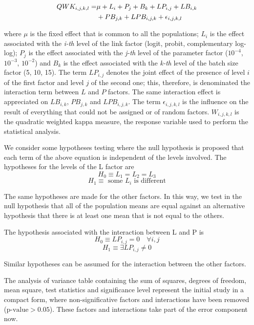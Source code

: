 \documentclass[journal]{IEEEtran}
\begin{document}
	\begin{equation}
	\begin{aligned}
	\footnotesize
	QWK_{i,j,k,l} = & \mu + L_i + P_j + B_k + LP_{i,j} + LB_{i,k} \\& + PB_{j,k} + LPB_{i,j,k} + \epsilon_{i,j,k,l}
	\label{eq:anova3}
	\end{aligned}
	\end{equation}
	
	where $\mu$ is the fixed effect that is common to all the populations; $L_i$ is the effect associated with the \textit{i-th} level of the link factor (logit, probit, complementary log-log); $P_j$ is the effect associated with the \textit{j-th} level of the parameter factor ($10^{-4}$, $10^{-3}$, $10^{-2}$) and $B_k$ is the effect associated with the \textit{k-th} level of the batch size factor (5, 10, 15). The term $LP_{i,j}$ denotes the joint effect of the presence of level $i$ of the first factor and level $j$ of the second one; this, therefore, is denominated the interaction term between $L$ and $P$ factors. The same interaction effect is appreciated on $LB_{i,k}$, $PB_{j,k}$ and $LPB_{i,j,k}$. The term $\epsilon_{i,j,k,l}$ is the influence on the result of everything that could not be assigned or of random factors. $W_{i,j,k,l}$ is the quadratic weighted kappa measure, the response variable used to perform the statistical analysis.
	
	We consider some hypotheses testing where the null hypothesis is proposed that each term of the above equation is independent of the levels involved. The hypotheses for the levels of the L factor are
	\[
	H_0 \equiv L_1 = L_2 = L_3
	\]
	\[
	H_1 \equiv \text{ some } L_i \text{ is different}
	\]
	
	The same hypotheses are made for the other factors. In this way, we test in the null hypothesis that all of the population means are equal against an alternative hypothesis that there is at least one mean that is not equal to the others.
	
	The hypothesis associated with the interaction between L and P is
	\[
	H_0 \equiv LP_{i,j} = 0 \quad \forall i,j
	\]
	\[
	H_1 \equiv \exists LP_{i,j} \ne 0
	\]
	
	Similar hypotheses can be assumed for the interaction between the other factors.
	
	The analysis of variance table containing the sum of squares, degrees of freedom, mean square, test statistics and significance level represent the initial study in a compact form, where non-significative factors and interactions have been removed ($\text{p-value} > 0.05$). These factors and interactions take part of the error component now.
	
\end{document}
